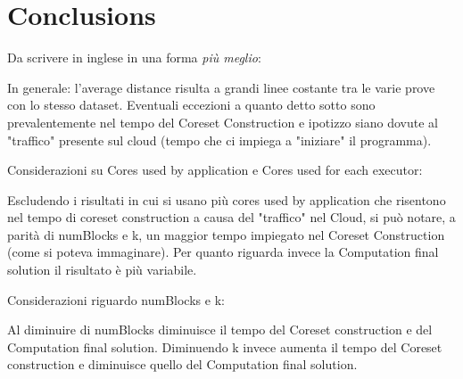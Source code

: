 \documentclass[10pt]{article}
\begin{document}
\section{Conclusions}
Da scrivere in inglese in una forma \textit{pi\`{u} meglio}:

In generale: l'average distance risulta a grandi linee costante tra le varie prove con lo stesso dataset. Eventuali eccezioni a quanto detto sotto sono prevalentemente nel tempo del Coreset Construction e ipotizzo siano dovute al "traffico" presente sul cloud (tempo che ci impiega a "iniziare" il programma).

Considerazioni su Cores used by application e Cores used for each executor:

Escludendo i risultati in cui si usano pi\`{u} cores used by application che risentono nel tempo di coreset construction a causa del "traffico" nel Cloud, si pu\`{o} notare, a parità di numBlocks e k, un maggior tempo impiegato nel Coreset Construction (come si poteva immaginare). Per quanto riguarda invece la Computation final solution il risultato è più variabile.

Considerazioni riguardo numBlocks e k:

Al diminuire di numBlocks diminuisce il tempo del Coreset construction e del Computation final solution. Diminuendo k invece aumenta il tempo del Coreset construction e diminuisce quello del Computation final solution.
\end{document}
